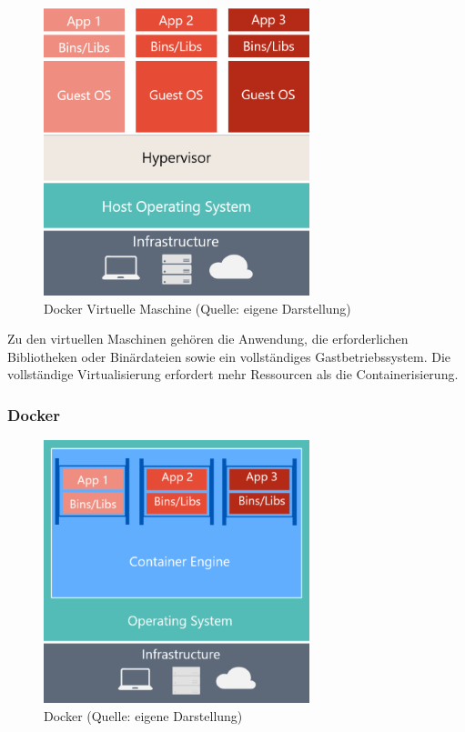 \begin{figure}[H]
    \begin{center}
        \includegraphics[scale=0.8]{images/docker-vm.png}
        \caption{Docker Virtuelle Maschine (Quelle: eigene Darstellung)}
    \end{center}
\end{figure}

Zu den virtuellen Maschinen gehören die Anwendung, die erforderlichen Bibliotheken oder Binärdateien sowie ein vollständiges Gastbetriebssystem. Die vollständige Virtualisierung erfordert mehr Ressourcen als die Containerisierung. \cite{docker}

\subsubsection{Docker}

\begin{figure}[H]
    \begin{center}
        \includegraphics[scale=0.8]{images/docker.png}
        \caption{Docker (Quelle: eigene Darstellung)}
    \end{center}
\end{figure}

